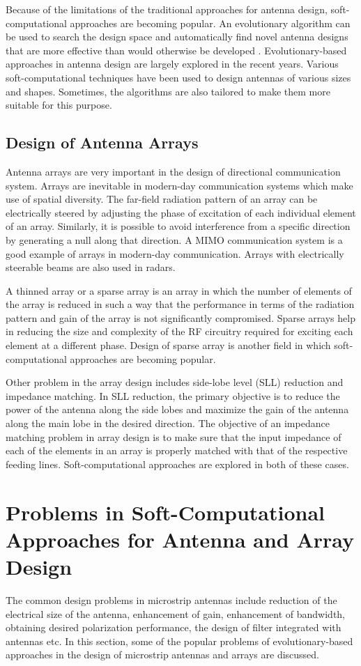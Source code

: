 Because of the limitations of the traditional approaches for antenna design, soft-computational approaches are becoming popular. An evolutionary algorithm can be used to search the design space and automatically find novel antenna designs that are more effective than would otherwise be developed \cite{cadNASA}. Evolutionary-based approaches in antenna design are largely explored in the recent years. Various soft-computational techniques have been used to design antennas of various sizes and shapes. Sometimes, the algorithms are also tailored to make them more suitable for this purpose.

\subsection{Design of Antenna Arrays}
Antenna arrays are very important in the design of directional communication system. Arrays are inevitable in modern-day communication systems which make use of spatial diversity. The far-field radiation pattern of an array can be electrically steered by adjusting the phase of excitation of each individual element of an array. Similarly, it is possible to avoid interference from a specific direction by generating a null along that direction. A MIMO communication system is a good example of arrays in modern-day communication. Arrays with electrically steerable beams are also used in radars.

A thinned array or a sparse array is an array in which the number of elements of the array is reduced in such a way that the performance in terms of the radiation pattern and gain of the array is not significantly compromised. Sparse arrays help in reducing the size and complexity of the RF circuitry required for exciting each element at a different phase. Design of sparse array is another field in which soft-computational approaches are becoming popular.

Other problem in the array design includes side-lobe level (SLL) reduction and impedance matching. In SLL reduction, the primary objective is to reduce the power of the antenna along the side lobes and maximize the gain of the antenna along the main lobe in the desired direction. The objective of an impedance matching problem in array design is to make sure that the input impedance of each of the elements in an array is properly matched with that of the respective feeding lines. Soft-computational approaches are explored in both of these cases.

\section{Problems in Soft-Computational Approaches for Antenna and Array Design}
The common design problems in microstrip antennas include reduction of the electrical size of the antenna, enhancement of gain, enhancement of bandwidth, obtaining desired polarization performance, the design of filter integrated with antennas etc. In this section, some of the popular problems of evolutionary-based approaches in the design of microstrip antennas and arrays are discussed.
